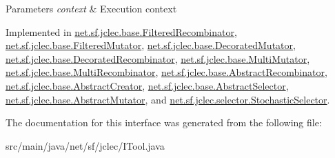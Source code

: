 \begin{DoxyParams}{Parameters}
{\em context} & Execution context \\
\hline
\end{DoxyParams}


Implemented in \hyperlink{classnet_1_1sf_1_1jclec_1_1base_1_1_filtered_recombinator_ab492294f4c41c12c8832051623b225f4}{net.\-sf.\-jclec.\-base.\-Filtered\-Recombinator}, \hyperlink{classnet_1_1sf_1_1jclec_1_1base_1_1_filtered_mutator_ae5664f7971d88d670a061b2057774e83}{net.\-sf.\-jclec.\-base.\-Filtered\-Mutator}, \hyperlink{classnet_1_1sf_1_1jclec_1_1base_1_1_decorated_mutator_afa0585c251b1363b8064956f5d2d6d25}{net.\-sf.\-jclec.\-base.\-Decorated\-Mutator}, \hyperlink{classnet_1_1sf_1_1jclec_1_1base_1_1_decorated_recombinator_a422262d71b7e49d04f11cf0d655278b2}{net.\-sf.\-jclec.\-base.\-Decorated\-Recombinator}, \hyperlink{classnet_1_1sf_1_1jclec_1_1base_1_1_multi_mutator_a1c5204b6dcf9f3323a8dcf8271df56e0}{net.\-sf.\-jclec.\-base.\-Multi\-Mutator}, \hyperlink{classnet_1_1sf_1_1jclec_1_1base_1_1_multi_recombinator_a3919dc3aeb37b38753c029c22f27a307}{net.\-sf.\-jclec.\-base.\-Multi\-Recombinator}, \hyperlink{classnet_1_1sf_1_1jclec_1_1base_1_1_abstract_recombinator_aa07502c99a8d181ac13d69d464bbd703}{net.\-sf.\-jclec.\-base.\-Abstract\-Recombinator}, \hyperlink{classnet_1_1sf_1_1jclec_1_1base_1_1_abstract_creator_a4528e7dbcb4715766d9f877ee6257069}{net.\-sf.\-jclec.\-base.\-Abstract\-Creator}, \hyperlink{classnet_1_1sf_1_1jclec_1_1base_1_1_abstract_selector_a58922faccb1ed92b428192814f72f573}{net.\-sf.\-jclec.\-base.\-Abstract\-Selector}, \hyperlink{classnet_1_1sf_1_1jclec_1_1base_1_1_abstract_mutator_a09e2996e9f6715d658b07d41971801c8}{net.\-sf.\-jclec.\-base.\-Abstract\-Mutator}, and \hyperlink{classnet_1_1sf_1_1jclec_1_1selector_1_1_stochastic_selector_a8230658188434a2f123d01c19f136969}{net.\-sf.\-jclec.\-selector.\-Stochastic\-Selector}.



The documentation for this interface was generated from the following file\-:\begin{DoxyCompactItemize}
\item 
src/main/java/net/sf/jclec/I\-Tool.\-java\end{DoxyCompactItemize}
